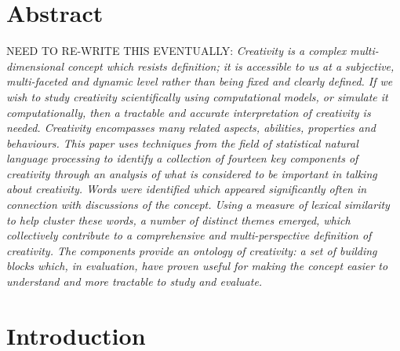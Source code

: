 \documentclass[10pt,letterpaper]{article}
\begin{document}
\section*{Abstract}

NEED TO RE-WRITE THIS EVENTUALLY:
{\em
Creativity is a complex multi-dimensional concept which resists definition; it is accessible to us at a subjective, multi-faceted and dynamic level rather than being fixed and clearly defined. If we wish to study creativity scientifically using computational models, or simulate it computationally, then a tractable and accurate interpretation of creativity is needed. Creativity encompasses many related aspects, abilities, properties and behaviours. This paper uses techniques from the field of statistical natural language processing to identify a collection of fourteen key components of creativity through an analysis of what is considered to be important in talking about creativity. Words were identified which appeared significantly often in connection with discussions of the concept. Using a measure of lexical similarity to help cluster these words, a number of distinct themes emerged, which collectively contribute to a comprehensive and multi-perspective definition of creativity. The components provide an ontology of creativity: a set of building blocks which, in evaluation, have proven useful for making the concept easier to understand and more tractable to study and evaluate.}



\linenumbers

\section*{Introduction}\label{intro}

\end{document}
